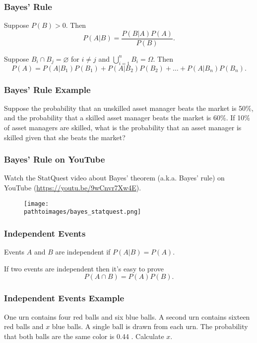 \documentclass{beamer}
\newcommand{\pathtoimages}{/Users/charlesrambo/Desktop/Bootcamp24/Images}
\begin{document}
\begin{frame}
\frametitle{Bayes' Rule}

\begin{Theorem}[Bayes]
Suppose $P(B) > 0$. Then
$$
P(A|B) = \frac{P(B|A) P(A)}{P(B)}.
$$
\end{Theorem}

\begin{Theorem}
Suppose $B_i \cap B_j = \varnothing$ for $i\neq j$ and $\displaystyle\bigcup_{i = 1}^n B_i = \Omega$. Then
$$
P(A) = P(A|B_1) P(B_1) + P(A|B_2)P(B_2) + \ldots + P(A|B_n) P(B_n).
$$
\end{Theorem}

\end{frame}

\begin{frame}[t]
\frametitle{Bayes' Rule Example}
\small
\begin{Example}
Suppose the probability that an unskilled asset manager beats the market is 50\%, and the probability that a skilled asset manager beats the market is 60\%. If 10\% of asset managers are skilled, what is the probability that an asset manager is skilled given that she beats the market?
\end{Example}

\end{frame}

\begin{frame}
\frametitle{Bayes' Rule on YouTube}
Watch the StatQuest video about Bayes' theorem (a.k.a. Bayes' rule) on YouTube (\url{https://youtu.be/9wCnvr7Xw4E}).
\begin{figure}
\centering
\texttt{[image: \\pathtoimages/bayes\_statquest.png]}
\end{figure}

\end{frame}

\begin{frame}
\frametitle{Independent Events}

\begin{Definition}
Events $A$ and $B$ are independent if $P(A|B) = P(A)$.
\end{Definition}
If two events are independent then it's easy to prove
$$
P(A\cap B) = P(A) P(B).
$$
\end{frame}

\begin{frame}[t]
\frametitle{Independent Events Example}
\small
\begin{Example}
One urn contains four red balls and six blue balls. A second urn contains sixteen red balls and $x$ blue balls. A single ball is drawn from each urn. The probability that both balls are the same color is 0.44 . Calculate $x$.
\end{Example}

\end{frame}
\end{document}
